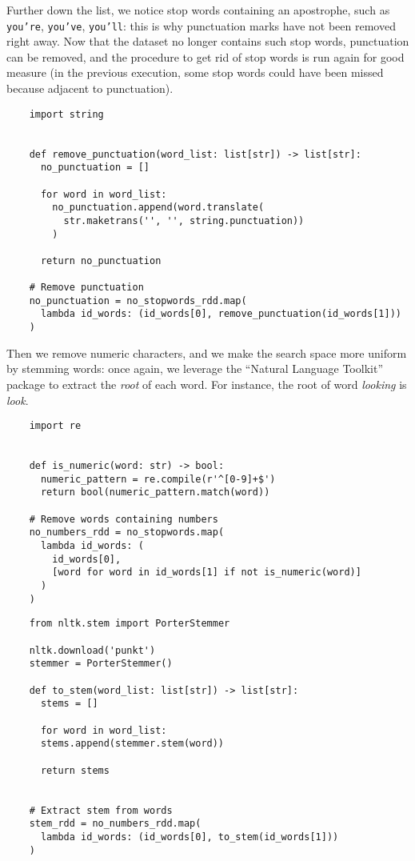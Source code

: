 \documentclass{article}
\begin{document}
  Further down the list, we notice stop words containing an apostrophe, such as
  \texttt{you're}, \texttt{you've}, \texttt{you'll}: this is why punctuation
  marks have not been removed right away. Now that the dataset no longer
  contains such stop words, punctuation can be removed, and the procedure to
  get rid of stop words is run again for good measure (in the previous
  execution, some stop words could have been missed because adjacent to
  punctuation). \\
  \begin{verbatim}
    import string


    def remove_punctuation(word_list: list[str]) -> list[str]:
      no_punctuation = []

      for word in word_list:
        no_punctuation.append(word.translate(
          str.maketrans('', '', string.punctuation))
        )

      return no_punctuation

    # Remove punctuation
    no_punctuation = no_stopwords_rdd.map(
      lambda id_words: (id_words[0], remove_punctuation(id_words[1]))
    )
  \end{verbatim}
  Then we remove numeric characters, and we make the search space more uniform
  by stemming words: once again, we leverage the “Natural Language Toolkit”
  package to extract the \textit{root} of each word. For instance, the root of
  word \textit{looking} is \textit{look}. \\
  \begin{verbatim}
    import re


    def is_numeric(word: str) -> bool:
      numeric_pattern = re.compile(r'^[0-9]+$')
      return bool(numeric_pattern.match(word))

    # Remove words containing numbers
    no_numbers_rdd = no_stopwords.map(
      lambda id_words: (
        id_words[0],
        [word for word in id_words[1] if not is_numeric(word)]
      )
    )
  \end{verbatim}
  \begin{verbatim}
    from nltk.stem import PorterStemmer

    nltk.download('punkt')
    stemmer = PorterStemmer()

    def to_stem(word_list: list[str]) -> list[str]:
      stems = []

      for word in word_list:
      stems.append(stemmer.stem(word))

      return stems


    # Extract stem from words
    stem_rdd = no_numbers_rdd.map(
      lambda id_words: (id_words[0], to_stem(id_words[1]))
    )
  \end{verbatim}
\end{document}
